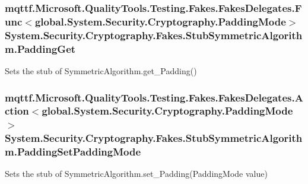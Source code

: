 \hypertarget{class_system_1_1_security_1_1_cryptography_1_1_fakes_1_1_stub_symmetric_algorithm_aa113a244e431a212a5becafd6e978a6d}{
\subsubsection[{Padding\-Get}]{\setlength{\rightskip}{0pt plus 5cm}mqttf.\-Microsoft.\-Quality\-Tools.\-Testing.\-Fakes.\-Fakes\-Delegates.\-Func$<$global.\-System.\-Security.\-Cryptography.\-Padding\-Mode$>$ System.\-Security.\-Cryptography.\-Fakes.\-Stub\-Symmetric\-Algorithm.\-Padding\-Get}}\label{class_system_1_1_security_1_1_cryptography_1_1_fakes_1_1_stub_symmetric_algorithm_aa113a244e431a212a5becafd6e978a6d}


Sets the stub of Symmetric\-Algorithm.\-get\-\_\-\-Padding()

\hypertarget{class_system_1_1_security_1_1_cryptography_1_1_fakes_1_1_stub_symmetric_algorithm_a4b0c012c6eec188be3d7d4543e080957}{
\subsubsection[{Padding\-Set\-Padding\-Mode}]{\setlength{\rightskip}{0pt plus 5cm}mqttf.\-Microsoft.\-Quality\-Tools.\-Testing.\-Fakes.\-Fakes\-Delegates.\-Action$<$global.\-System.\-Security.\-Cryptography.\-Padding\-Mode$>$ System.\-Security.\-Cryptography.\-Fakes.\-Stub\-Symmetric\-Algorithm.\-Padding\-Set\-Padding\-Mode}}\label{class_system_1_1_security_1_1_cryptography_1_1_fakes_1_1_stub_symmetric_algorithm_a4b0c012c6eec188be3d7d4543e080957}


Sets the stub of Symmetric\-Algorithm.\-set\-\_\-\-Padding(\-Padding\-Mode value)



